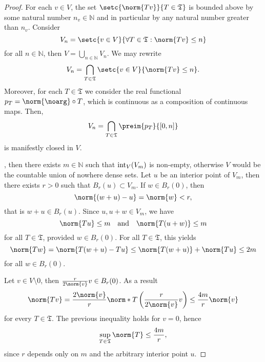\begin{proof}
    For each \(v \in V\), the set \(\setc{\norm{Tv}}{T \in \mathfrak{T}}\) is bounded above by some natural number \(n_v \in \mathbb{N}\) and in particular by any natural number greater than \(n_v\). Consider
    \begin{equation*}
        V_n = \setc{v \in V}{\forall T \in \mathfrak{T} : \norm{Tv} \leq n}
    \end{equation*}
    for all \(n \in \mathbb{N}\), then \(V = \bigcup_{n \in \mathbb{N}} V_n\). We may rewrite
    \begin{equation*}
        V_n = \bigcap_{T \in \mathfrak{T}} \setc{v \in V}{\norm{Tv}\leq n}.
    \end{equation*}
    Moreover, for each \(T \in \mathfrak{T}\) we consider the real functional \(p_T = \norm{\noarg} \circ T\), which is continuous as a composition of continuous maps. Then,
    \begin{equation*}
        V_n = \bigcap_{T \in \mathfrak{T}} \preim{p_T}{[0,n]}
    \end{equation*}
    is manifestly closed in \(V\).

    , then there exists \(m \in \mathbb{N}\) such that \(\operatorname{int}_V(V_m)\) is non-empty, otherwise \(V\) would be the countable union of nowhere dense sets. Let \(u\) be an interior point of \(V_m\), then there exists \(r > 0\) such that \(B_r(u) \subset V_m\). If \(w \in B_r(0)\), then
    \begin{equation*}
        \norm{(w + u) - u} = \norm{w} < r,
    \end{equation*}
    that is \(w + u \in B_r(u)\). Since \(u, u + w \in V_m\), we have
    \begin{equation*}
        \norm{Tu} \leq m
        \quad\text{and}{\quad}
        \norm{T(u + w)} \leq m
    \end{equation*}
    for all \(T \in \mathfrak{T}\), provided \(w \in B_r(0)\). For all \(T \in \mathfrak{T}\), this yields
    \begin{equation*}
        \norm{Tw} = \norm{T(w + u) - Tu} \leq \norm{T(w + u)} + \norm{Tu} \leq 2m
    \end{equation*}
    for all \(w \in B_r(0)\).

    Let \(v \in V\setminus{0}\), then \(\frac{r}{2\norm{v}}v \in B_r(0)\). As a result
    \begin{equation*}
        \norm{Tv} = \frac{2\norm{v}}{r}\norm*{T\left(\frac{r}{2\norm{v}}v\right)} \leq \frac{4m}{r}\norm{v}
    \end{equation*}
    for every \(T \in \mathfrak{T}\). The previous inequality holds for \(v = 0\), hence
    \begin{equation*}
        \sup_{T \in \mathfrak{T}} \norm{T} \leq \frac{4m}{r},
    \end{equation*}
    since \(r\) depends only on \(m\) and the arbitrary interior point \(u\).
\end{proof}

